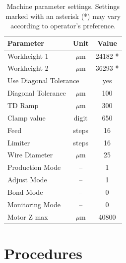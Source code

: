 \documentclass[10pt]{unlsilabsop}
\begin{document}
\begin{table}[hH]
\begin{center}
\caption{Machine parameter settings. Settings marked with an asterisk (*) may vary according to operator's preference.}
\label{tbl:otherpar}

\bigskip

\begin{tabular}{lcc}
\toprule
Parameter          & Unit   & Value \\
\midrule
Workheight 1       & $\mu$m & 24182 *\\
Workheight 2       & $\mu$m & 36293 * \\
\multicolumn{2}{l}{Use Diagonal Tolerance} & yes \\
Diagonal Tolerance & $\mu$m & 100 \\
TD Ramp            & $\mu$m & 300 \\
Clamp value        & digit  & 650 \\
Feed               & steps  & 16 \\
Limiter            & steps  & 16 \\
Wire Diameter      & $\mu$m & 25 \\
Production Mode    & --     & 1 \\
Adjust Mode        & --     & 1 \\
Bond Mode          & --     & 0 \\
Monitoring Mode    & --     & 0 \\
\midrule
Motor Z max        & $\mu$m & 40800 \\
    \bottomrule
\end{tabular}
\end{center}
\end{table}


\section{Procedures}
\end{document}
